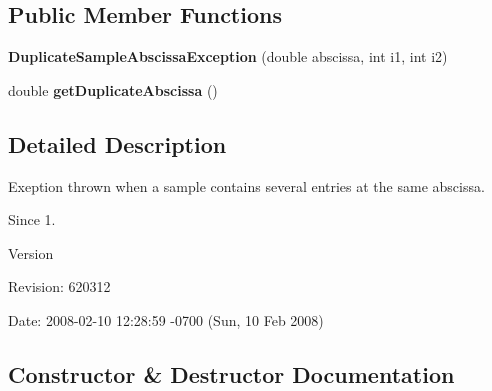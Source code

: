 \subsection*{Public Member Functions}
\begin{DoxyCompactItemize}
\item 
{\bf Duplicate\-Sample\-Abscissa\-Exception} (double abscissa, int i1, int i2)
\item 
double {\bf get\-Duplicate\-Abscissa} ()
\end{DoxyCompactItemize}


\subsection{Detailed Description}
Exeption thrown when a sample contains several entries at the same abscissa.

\begin{DoxySince}{Since}
1. 
\end{DoxySince}
\begin{DoxyVersion}{Version}

\end{DoxyVersion}
\begin{DoxyParagraph}{Revision\-:}
620312 
\end{DoxyParagraph}
\begin{DoxyParagraph}{Date\-:}
2008-\/02-\/10 12\-:28\-:59 -\/0700 (Sun, 10 Feb 2008) 
\end{DoxyParagraph}


\subsection{Constructor \& Destructor Documentation}
